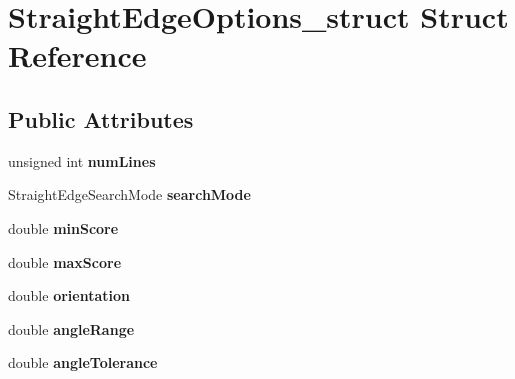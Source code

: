 \hypertarget{structStraightEdgeOptions__struct}{\section{\-Straight\-Edge\-Options\-\_\-struct \-Struct \-Reference}
\label{structStraightEdgeOptions__struct}
}
\subsection*{\-Public \-Attributes}
\begin{DoxyCompactItemize}
\item 
\hypertarget{structStraightEdgeOptions__struct_a9acfea7e3b91cbb439f4043356e4cb27}{unsigned int {\bfseries num\-Lines}}\label{structStraightEdgeOptions__struct_a9acfea7e3b91cbb439f4043356e4cb27}

\item 
\hypertarget{structStraightEdgeOptions__struct_a0d59adc47245c1ac6c24e0a455fb7c42}{\-Straight\-Edge\-Search\-Mode {\bfseries search\-Mode}}\label{structStraightEdgeOptions__struct_a0d59adc47245c1ac6c24e0a455fb7c42}

\item 
\hypertarget{structStraightEdgeOptions__struct_ad4602b2956e69240a372fcfe4331ca18}{double {\bfseries min\-Score}}\label{structStraightEdgeOptions__struct_ad4602b2956e69240a372fcfe4331ca18}

\item 
\hypertarget{structStraightEdgeOptions__struct_ac4a057fb62c4cddc7081be8e6fbccff6}{double {\bfseries max\-Score}}\label{structStraightEdgeOptions__struct_ac4a057fb62c4cddc7081be8e6fbccff6}

\item 
\hypertarget{structStraightEdgeOptions__struct_a86da6e05a1d135fd9c5742ae38161bb3}{double {\bfseries orientation}}\label{structStraightEdgeOptions__struct_a86da6e05a1d135fd9c5742ae38161bb3}

\item 
\hypertarget{structStraightEdgeOptions__struct_ab7866682c6497d0b1064bce5eeabec8b}{double {\bfseries angle\-Range}}\label{structStraightEdgeOptions__struct_ab7866682c6497d0b1064bce5eeabec8b}

\item 
\hypertarget{structStraightEdgeOptions__struct_a549faee59059302a4310486ff08e8b2d}{double {\bfseries angle\-Tolerance}}\label{structStraightEdgeOptions__struct_a549faee59059302a4310486ff08e8b2d}


\end{DoxyCompactItemize}
